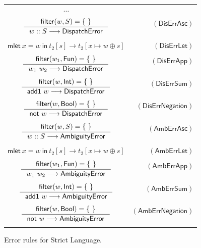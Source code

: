 \documentclass[preprint,authoryear,sort&compress,9pt,nocopyrightspace]{article}
\newcommand\rulename[1]{\mathsf{(#1)}}
\newcommand{\tto}{\longrightarrow}
\newcommand{\conf}[2][s]{(#2)[#1]}
\newcommand{\confextW}[1]{#1 [x \mapsto w \oplus s]}
\newcommand{\ascripS}[1]{#1::S}
\newcommand{\oletP}[3]{\mathsf{mlet} \ x = #2 \ \mathsf{in}  \ #3}
\newcommand{\absST}[2]{\lambda #1. \ #2}
\newcommand{\negacion}[1]{\mathsf{not} \ #1}
\newcommand{\suma}[1]{\mathsf{add1} \ #1}
\newcommand{\boolt}{\mathsf{Bool}}
\newcommand{\intt}{\mathsf{Int}}
\newcommand{\funt}{\mathsf{Fun}}
\newcommand{\filtrar}{\mathsf{filter}}
\newcommand{\buscar}{\mathsf{lookup}}
\newcommand{\dispatcherror}{\mathsf{DispatchError}}
\newcommand{\ambiguityerror}{\mathsf{AmbiguityError}}
\newcommand{\semanticC}{Strict Language}
\begin{document}
\begin{figure}[]
\begin{small}
\begin{center}
\begin{tabular}{|c r|}
\hline
$\cdots$&\\
$ \inference {\filtrar(w, S) = \{\ \}} {\ascripS{w} \tto \dispatcherror} $&$\rulename{DisErrAsc} $\\
&\\
${\oletP{T_1}{w}{t_2[s]} \tto \confextW{t_2}}$&$\rulename{DisErrLet} $\\
&\\

$\inference{ \filtrar(w_1, \funt) = \{ \ \}}{w_1 \ w_2 \tto \dispatcherror}$&$\rulename{DisErrApp}$\\
&\\
$\inference {\filtrar(w, \intt)  = \{\ \} }{\suma{w} \tto \dispatcherror}$&$\rulename{DisErrSum}$\\
&\\
$\inference {\filtrar(w, \boolt)  = \{ \ \} }{\negacion{w}\tto \dispatcherror}$&$\rulename{DisErrNegation}$\\
&\\

$ \inference {\filtrar(w, S) = \{\ \}} {\ascripS{w} \tto \ambiguityerror} $&$\rulename{AmbErrAsc} $\\
&\\
${\oletP{T_1}{w}{t_2[s]} \tto \confextW{t_2}}$&$\rulename{AmbErrLet} $\\
&\\

$\inference{ \filtrar(w_1, \funt) = \{ \ \}}{w_1 \ w_2 \tto \ambiguityerror}$&$\rulename{AmbErrApp}$\\
&\\
$\inference {\filtrar(w, \intt)  = \{\ \} }{\suma{w} \tto \ambiguityerror}$&$\rulename{AmbErrSum}$\\
&\\
$\inference {\filtrar(w, \boolt)  = \{ \ \} }{\negacion{w}\tto \ambiguityerror}$&$\rulename{AmbErrNegation}$\\
&\\
\hline
\end{tabular}
\caption{Error rules for \semanticC.}
\label{tabla:errorRulesStrictMore}
\end{center}
\end{small}
\end{figure}
\end{document}
